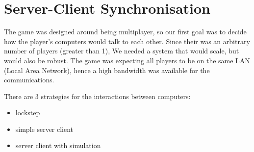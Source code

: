 
\section{Server-Client Synchronisation}

\newcommand{\stepOneName}{lockstep}
\newcommand{\stepTwoName}{simple server client}
\newcommand{\stepThreeName}{server client with simulation}

The game was designed around being multiplayer, so our first goal was to decide how the player's computers would talk to each other.
Since their was an arbitrary number of players (greater than 1), We needed a system that would scale, but would also be robust.
The game was expecting all players to be on the same LAN (Local Area Network), hence a high bandwidth was available for the communications.

There are 3 strategies for the interactions between computers:
\begin{itemize}
\item \stepOneName
\item \stepTwoName
\item \stepThreeName
\end{itemize}

